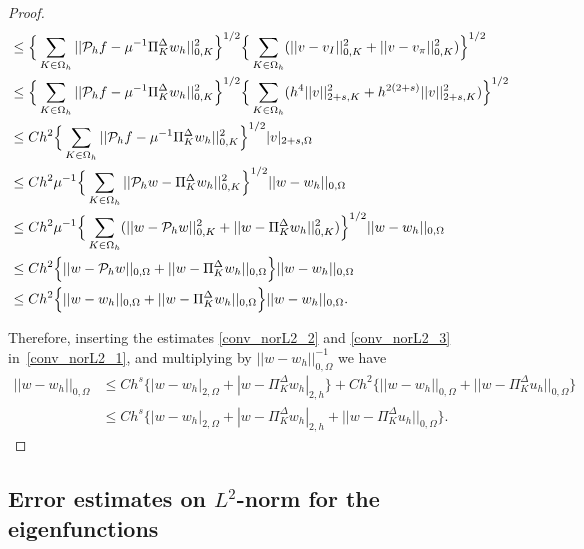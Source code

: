 \documentclass[final,reqno]{elsarticle}
\def\O{\Omega}
\def\PiK{\Pi_{K}^{\Delta}}
\begin{document}
\begin{proof}
\begin{align}
&\leq\Big\{\sum\limits_{K\in \Omega_h}||\mathcal{P}_hf-\mu^{-1}\PiK w_h ||_{0,K}^2 \Big\}^{1/2}\Big\{\sum\limits_{K\in \Omega_h}(||v-v_I ||_{0,K}^2 + || v-v_{\pi}||_{0,K}^2 )\Big\}^{1/2}\notag\\
&\leq \Big\{\sum\limits_{K\in \Omega_h}||\mathcal{P}_hf-\mu^{-1}\PiK w_h ||_{0,K}^2 \Big\}^{1/2}\Big\{\sum\limits_{K\in \Omega_h}(h^4||v||_{2+s,K}^2 + h^{2(2+s)}|| v||_{2+s,K}^2 )\Big\}^{1/2}\notag\\
&\leq Ch^2\Big\{\sum\limits_{K\in \Omega_h}||\mathcal{P}_hf-\mu^{-1}\PiK w_h ||_{0,K}^2 \Big\}^{1/2}|v|_{2+s,\O}\notag\\
&\leq Ch^2\mu^{-1}\Big\{\sum\limits_{K\in \Omega_h}||\mathcal{P}_hw-\PiK w_h ||_{0,K}^2 \Big\}^{1/2}||w-w_h||_{0,\O}\notag\\
&\leq Ch^2\mu^{-1}\Big\{\sum\limits_{K\in \Omega_h}(||w-\mathcal{P}_hw||_{0,K}^2+||w-\PiK w_h ||_{0,K}^2) \Big\}^{1/2}||w-w_h||_{0,\O}\notag\\
&\leq Ch^2\Big\{||w-\mathcal{P}_hw||_{0,\O}+||w-\PiK w_h ||_{0,\Omega} \Big\}||w-w_h||_{0,\O}\notag\\
&\leq Ch^2\Big\{||w-w_h||_{0,\O}+||w-\PiK w_h ||_{0,\Omega} \Big\}||w-w_h||_{0,\O}.\label{conv_norL2_3}
\end{align}

Therefore, inserting the estimates \eqref{conv_norL2_2} and \eqref{conv_norL2_3} in~\eqref{conv_norL2_1}, and multiplying by  $||w-w_h||_{0,\Omega}^{-1}$ we have
\begin{align*}
||w-w_h ||_{0,\O}&\leq C h^s\Big\{|w-w_h|_{2,\O}+|w-\PiK w_h|_{2,h}\Big\}+Ch^2\Big\{||w-w_h||_{0,\O}+||w-\PiK u_h ||_{0,\Omega} \Big\}\nonumber\\
&\leq C h^s\Big\{|w-w_h|_{2,\Omega}+|w-\PiK w_h|_{2,h} +||w-\PiK u_h ||_{0,\Omega} \Big\}.
\end{align*}
\end{proof}

\subsection{Error estimates on $L^2$-norm for the eigenfunctions}
\end{document}
